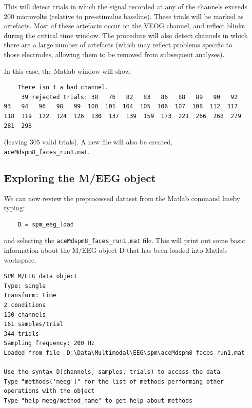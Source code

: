 This will detect trials in which the signal recorded at any of the channels exceeds 200 microvolts (relative to pre-stimulus baseline). These trials will be marked as artefacts. Most of these artefacts occur on the VEOG channel, and reflect blinks during the critical time window. The procedure will also detect channels in which there are a large number of artefacts (which may reflect problems specific to those electrodes, allowing them to be removed from subsequent analyses).

In this case, the Matlab window will show:
\begin{verbatim}
    There isn't a bad channel.
     39 rejected trials: 38   76   82   83   86   88   89   90   92   93   94   96   98   99  100  101  104  105  106  107  108  112  117  118  119  122  124  126  130  137  139  159  173  221  266  268  279  281  298
\end{verbatim}
(leaving 305 valid trials). A new file will also be created, \verb!aceMdspm8_faces_run1.mat!.

\subsection{Exploring the M/EEG object}
We can now review the preprocessed dataset from the Matlab command lineby typing:
\begin{verbatim}
    D = spm_eeg_load
\end{verbatim}
and selecting the \verb!aceMdspm8_faces_run1.mat! file. This will print out some basic information about the M/EEG object D that has been loaded into Matlab workspace.
\begin{verbatim}
SPM M/EEG data object
Type: single
Transform: time
2 conditions
130 channels
161 samples/trial
344 trials
Sampling frequency: 200 Hz
Loaded from file  D:\Data\Multimodal\EEG\spm\aceMdspm8_faces_run1.mat

Use the syntax D(channels, samples, trials) to access the data
Type "methods('meeg')" for the list of methods performing other operations with the object
Type "help meeg/method_name" to get help about methods
\end{verbatim}

